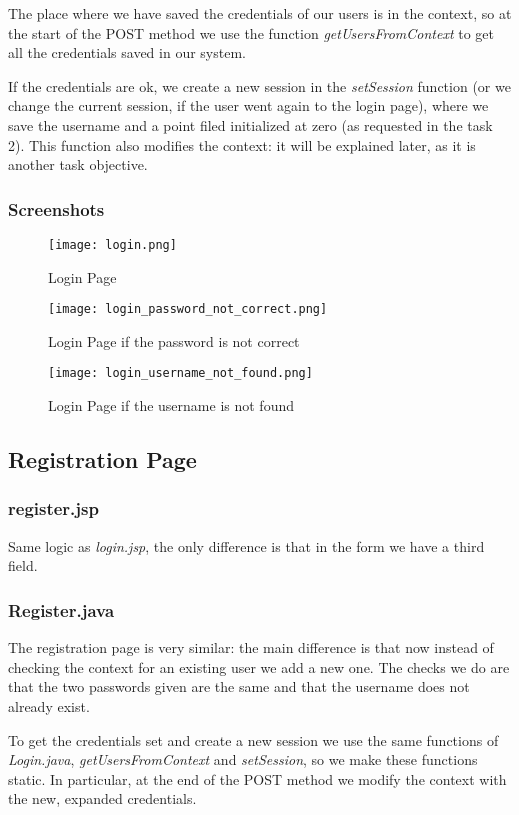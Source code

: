 The place where we have saved the credentials of our users is in the context, so at the start of the POST method we use the function \textit{getUsersFromContext} to get all the credentials saved in our system.

If the credentials are ok, we create a new session in the \textit{setSession} function (or we change the current session, if the user went again to the login page), where we save the username and a point filed initialized at zero (as requested in the task 2). This function also modifies the context: it will be explained later, as it is another task objective.


\subsubsection{Screenshots}
\begin{figure}[H]
  \centering
  \texttt{[image: login.png]}
  \caption{Login Page}
\end{figure}
\begin{figure}[H]
  \centering
  \texttt{[image: login\_password\_not\_correct.png]}
  \caption{Login Page if the password is not correct}
\end{figure}
\begin{figure}[H]
  \centering
  \texttt{[image: login\_username\_not\_found.png]}
  \caption{Login Page if the username is not found}
\end{figure}

\subsection{Registration Page}
\subsubsection{register.jsp}
Same logic as \textit{login.jsp}, the only difference is that in the form we have a third field.
\subsubsection{Register.java}
The registration page is very similar: the main difference is that now instead of checking the context for an existing user we add a new one. The checks we do are that the two passwords given are the same and that the username does not already exist.

To get the credentials set and create a new session we use the same functions of \textit{Login.java}, \textit{getUsersFromContext} and \textit{setSession}, so we make these functions static. In particular, at the end of the POST method we modify the context with the new, expanded credentials.


